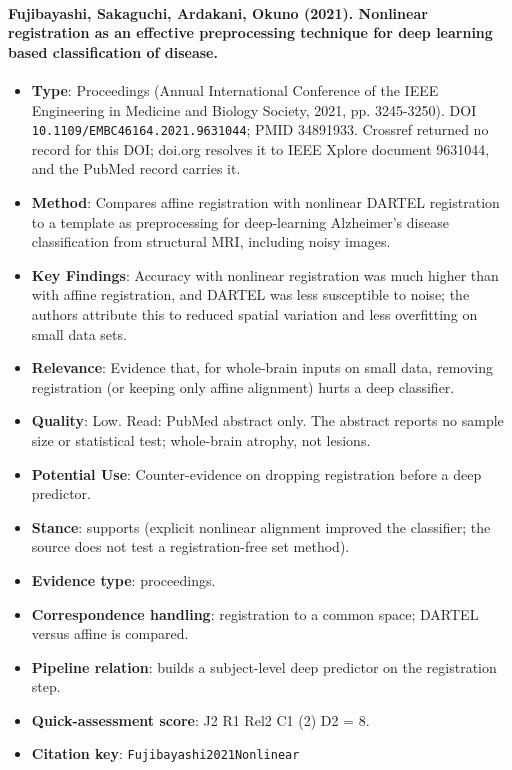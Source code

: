 \documentclass[journal,onecolumn]{IEEEtran}
\begin{document}
\paragraph{Fujibayashi, Sakaguchi, Ardakani, Okuno (2021). Nonlinear registration as an effective preprocessing technique for deep learning based classification of disease.~\cite{Fujibayashi2021Nonlinear}}\mbox{}

\begin{itemize}

\item{} \textbf{Type}: Proceedings (Annual International Conference of the IEEE Engineering in Medicine and Biology Society, 2021, pp. 3245-3250). DOI \nolinkurl{10.1109/EMBC46164.2021.9631044}; PMID 34891933. Crossref returned no record for this DOI; doi.org resolves it to IEEE Xplore document 9631044, and the PubMed record carries it.

\item{} \textbf{Method}: Compares affine registration with nonlinear DARTEL registration to a template as preprocessing for deep-learning Alzheimer's disease classification from structural MRI, including noisy images.

\item{} \textbf{Key Findings}: Accuracy with nonlinear registration was much higher than with affine registration, and DARTEL was less susceptible to noise; the authors attribute this to reduced spatial variation and less overfitting on small data sets.

\item{} \textbf{Relevance}: Evidence that, for whole-brain inputs on small data, removing registration (or keeping only affine alignment) hurts a deep classifier.

\item{} \textbf{Quality}: Low. Read: PubMed abstract only. The abstract reports no sample size or statistical test; whole-brain atrophy, not lesions.

\item{} \textbf{Potential Use}: Counter-evidence on dropping registration before a deep predictor.

\item{} \textbf{Stance}: supports (explicit nonlinear alignment improved the classifier; the source does not test a registration-free set method).

\item{} \textbf{Evidence type}: proceedings.

\item{} \textbf{Correspondence handling}: registration to a common space; DARTEL versus affine is compared.

\item{} \textbf{Pipeline relation}: builds a subject-level deep predictor on the registration step.

\item{} \textbf{Quick-assessment score}: J2 R1 Rel2 C1 (2) D2 = 8.

\item{} \textbf{Citation key}: \texttt{Fujibayashi2021Nonlinear}

\end{itemize}
\end{document}
